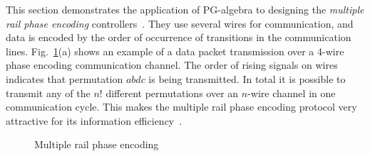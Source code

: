 This section demonstrates the application of PG-algebra to designing
the \emph{multiple rail phase encoding} controllers~\cite{2007_cdalessandro_async}.
They use several wires for communication, and data is encoded by the
order of occurrence of transitions in the communication lines. Fig.~\ref{fig:phase-encoding}(a)
shows an example of a data packet transmission over a 4-wire phase
encoding communication channel. The order of rising signals on wires
indicates that permutation $abdc$ is being transmitted. In total
it is possible to transmit any of the $n!$ different permutations
over an $n$-wire channel in one communication cycle. This makes the
multiple rail phase encoding protocol very attractive for its information
efficiency~\cite{2010_mokhov_ieee}. 

\begin{figure}[t]
\begin{centering}
\hfill{}\hfill{}\hfill{}
\par\end{centering}

\caption{Multiple rail phase encoding\label{fig:phase-encoding}}
\vspace{-6mm}
\end{figure}


